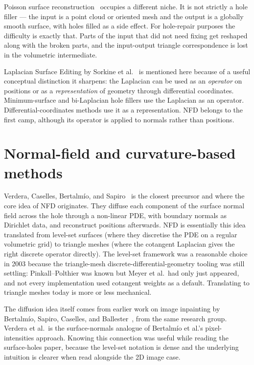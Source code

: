 Poisson surface reconstruction~\cite{kazhdan2006, kazhdan2013} occupies a different niche. It is not strictly a hole filler --- the input is a point cloud or oriented mesh and the output is a globally smooth surface, with holes filled as a side effect. For hole-repair purposes the difficulty is exactly that. Parts of the input that did not need fixing get reshaped along with the broken parts, and the input-output triangle correspondence is lost in the volumetric intermediate.

Laplacian Surface Editing by Sorkine et al.~\cite{sorkine2004} is mentioned here because of a useful conceptual distinction it sharpens: the Laplacian can be used as an \emph{operator} on positions or as a \emph{representation} of geometry through differential coordinates. Minimum-surface and bi-Laplacian hole fillers use the Laplacian as an operator. Differential-coordinates methods use it as a representation. NFD belongs to the first camp, although its operator is applied to normals rather than positions.

\section{Normal-field and curvature-based methods}

Verdera, Caselles, Bertalm{\'i}o, and Sapiro~\cite{verdera2003} is the closest precursor and where the core idea of NFD originates. They diffuse each component of the surface normal field across the hole through a non-linear PDE, with boundary normals as Dirichlet data, and reconstruct positions afterwards. NFD is essentially this idea translated from level-set surfaces (where they discretise the PDE on a regular volumetric grid) to triangle meshes (where the cotangent Laplacian gives the right discrete operator directly). The level-set framework was a reasonable choice in 2003 because the triangle-mesh discrete-differential-geometry tooling was still settling: Pinkall--Polthier was known but Meyer et al.\ had only just appeared, and not every implementation used cotangent weights as a default. Translating to triangle meshes today is more or less mechanical.

The diffusion idea itself comes from earlier work on image inpainting by Bertalm{\'i}o, Sapiro, Caselles, and Ballester~\cite{bertalmio2000}, from the same research group. Verdera et al.\ is the surface-normals analogue of Bertalm{\'i}o et al.'s pixel-intensities approach. Knowing this connection was useful while reading the surface-holes paper, because the level-set notation is dense and the underlying intuition is clearer when read alongside the 2D image case.

